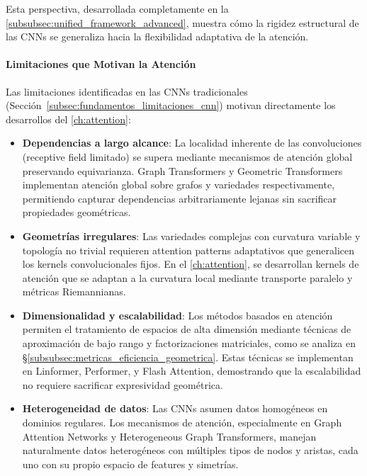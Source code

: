 Esta perspectiva, desarrollada completamente en la \autoref{subsubsec:unified_framework_advanced}, muestra cómo la rigidez estructural de las CNNs se generaliza hacia la flexibilidad adaptativa de la atención.

\paragraph{Limitaciones que Motivan la Atención}

Las limitaciones identificadas en las CNNs tradicionales (Sección~\ref{subsec:fundamentos_limitaciones_cnn}) motivan directamente los desarrollos del \autoref{ch:attention}:

\begin{itemize}
\item \textbf{Dependencias a largo alcance}: La localidad inherente de las convoluciones (receptive field limitado) se supera mediante mecanismos de atención global preservando equivarianza. Graph Transformers y Geometric Transformers implementan atención global sobre grafos y variedades respectivamente, permitiendo capturar dependencias arbitrariamente lejanas sin sacrificar propiedades geométricas.

\item \textbf{Geometrías irregulares}: Las variedades complejas con curvatura variable y topología no trivial requieren attention patterns adaptativos que generalicen los kernels convolucionales fijos. En el \autoref{ch:attention}, se desarrollan kernels de atención que se adaptan a la curvatura local mediante transporte paralelo y métricas Riemannianas.

\item \textbf{Dimensionalidad y escalabilidad}: Los métodos basados en atención permiten el tratamiento de espacios de alta dimensión mediante técnicas de aproximación de bajo rango y factorizaciones matriciales, como se analiza en §\ref{subsubsec:metricas_eficiencia_geometrica}. Estas técnicas se implementan en Linformer, Performer, y Flash Attention, demostrando que la escalabilidad no requiere sacrificar expresividad geométrica.

\item \textbf{Heterogeneidad de datos}: Las CNNs asumen datos homogéneos en dominios regulares. Los mecanismos de atención, especialmente en Graph Attention Networks y Heterogeneous Graph Transformers, manejan naturalmente datos heterogéneos con múltiples tipos de nodos y aristas, cada uno con su propio espacio de features y simetrías.
\end{itemize}

